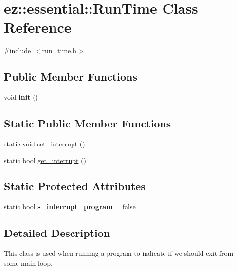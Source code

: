 \hypertarget{classez_1_1essential_1_1RunTime}{}\section{ez\+:\+:essential\+:\+:Run\+Time Class Reference}
\label{classez_1_1essential_1_1RunTime}


{\ttfamily \#include $<$run\+\_\+time.\+h$>$}

\subsection*{Public Member Functions}
\begin{DoxyCompactItemize}
\item 
\mbox{\label{classez_1_1essential_1_1RunTime_a18df9d77d3e2b12356bb1bee105ee540}} 
void {\bfseries init} ()
\end{DoxyCompactItemize}
\subsection*{Static Public Member Functions}
\begin{DoxyCompactItemize}
\item 
static void \hyperlink{classez_1_1essential_1_1RunTime_a1ee4569c16d51377188bd2023ea87c7d}{set\+\_\+interrupt} ()
\item 
static bool \hyperlink{classez_1_1essential_1_1RunTime_a19c72bc8f521a376e68e7d63d5f14a13}{get\+\_\+interrupt} ()
\end{DoxyCompactItemize}
\subsection*{Static Protected Attributes}
\begin{DoxyCompactItemize}
\item 
\mbox{\label{classez_1_1essential_1_1RunTime_a1ed5a71c5d1760595e049fbb51d8cfaa}} 
static bool {\bfseries s\+\_\+interrupt\+\_\+program} = false
\end{DoxyCompactItemize}


\subsection{Detailed Description}
This class is used when running a program to indicate if we should exit from some main loop. 

